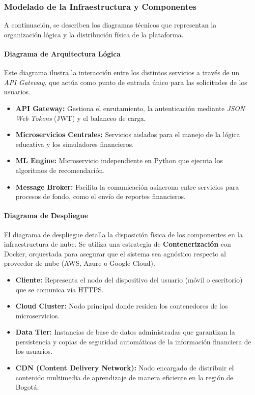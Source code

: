 \subsubsection*{Modelado de la Infraestructura y Componentes}
A continuación, se describen los diagramas técnicos que representan la organización lógica y la distribución física de la plataforma.

\paragraph*{Diagrama de Arquitectura Lógica}
Este diagrama ilustra la interacción entre los distintos servicios a través de un \textit{API Gateway}, que actúa como punto de entrada único para las solicitudes de los usuarios.

\begin{itemize}
	\item \textbf{API Gateway:} Gestiona el enrutamiento, la autenticación mediante \textit{JSON Web Tokens} (JWT) y el balanceo de carga.
	\item \textbf{Microservicios Centrales:} Servicios aislados para el manejo de la lógica educativa y los simuladores financieros.
	\item \textbf{ML Engine:} Microservicio independiente en Python que ejecuta los algoritmos de recomendación.
	\item \textbf{Message Broker:} Facilita la comunicación asíncrona entre servicios para procesos de fondo, como el envío de reportes financieros.
\end{itemize}

\paragraph*{Diagrama de Despliegue}
El diagrama de despliegue detalla la disposición física de los componentes en la infraestructura de nube. Se utiliza una estrategia de \textbf{Contenerización} con Docker, orquestada para asegurar que el sistema sea agnóstico respecto al proveedor de nube (AWS, Azure o Google Cloud).


\begin{itemize}
	\item \textbf{Cliente:} Representa el nodo del dispositivo del usuario (móvil o escritorio) que se comunica vía HTTPS.
	\item \textbf{Cloud Cluster:} Nodo principal donde residen los contenedores de los microservicios.
	\item \textbf{Data Tier:} Instancias de base de datos administradas que garantizan la persistencia y copias de seguridad automáticas de la información financiera de los usuarios.
	\item \textbf{CDN (Content Delivery Network):} Nodo encargado de distribuir el contenido multimedia de aprendizaje de manera eficiente en la región de Bogotá.
\end{itemize}

